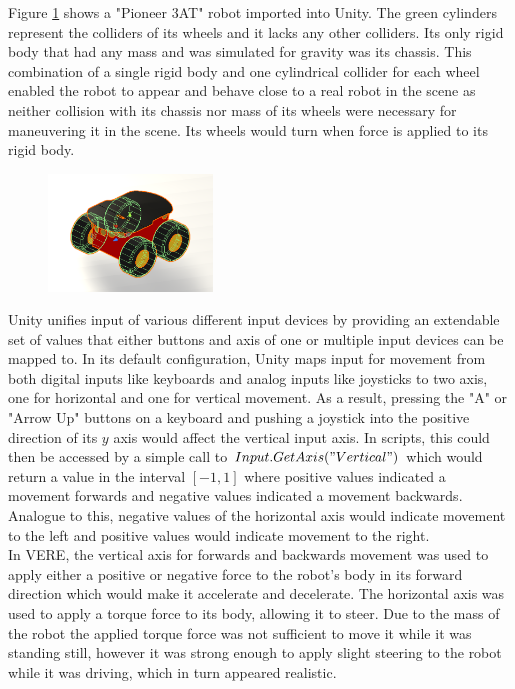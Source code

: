 Figure \ref{fig:pioneer3at} shows a "Pioneer 3AT" robot imported into Unity. The green cylinders represent the colliders of its wheels and it lacks any other colliders. Its only rigid body that had any mass and was simulated for gravity was its chassis. This combination of a single rigid body and one cylindrical collider for each wheel enabled the robot to appear and behave close to a real robot in the scene as neither collision with its chassis nor mass of its wheels were necessary for maneuvering it in the scene. Its wheels would turn when force is applied to its rigid body.
\begin{figure}[t]
    \centering
    \includegraphics[width=0.39\textwidth]{img/ch05/Pioneer3AT.png}
    \label{fig:pioneer3at}
\end{figure}
Unity unifies input of various different input devices by providing an extendable set of values that either buttons and axis of one or multiple input devices can be mapped to. In its default configuration, Unity maps input for movement from both digital inputs like keyboards and analog inputs like joysticks to two axis, one for horizontal and one for vertical movement. As a result, pressing the "A" or "Arrow Up" buttons on a keyboard and pushing a joystick into the positive direction of its $y$ axis would affect the vertical input axis. In scripts, this could then be accessed by a simple call to $Input.GetAxis("Vertical")$ which would return a value in the interval $[-1, 1]$ where positive values indicated a movement forwards and negative values indicated a movement backwards. Analogue to this, negative values of the horizontal axis would indicate movement to the left and positive values would indicate movement to the right.\\
In \ac{VERE}, the vertical axis for forwards and backwards movement was used to apply either a positive or negative force to the robot's body in its forward direction which would make it accelerate and decelerate. The horizontal axis was used to apply a torque force to its body, allowing it to steer. Due to the mass of the robot the applied torque force was not sufficient to move it while it was standing still, however it was strong enough to apply slight steering to the robot while it was driving, which in turn appeared realistic.

